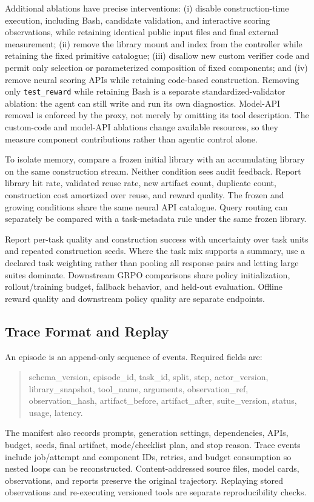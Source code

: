 Additional ablations have precise interventions: (i) disable construction-time execution, including Bash, candidate validation, and interactive scoring observations, while retaining identical public input files and final external measurement; (ii) remove the library mount and index from the controller while retaining the fixed primitive catalogue; (iii) disallow new custom verifier code and permit only selection or parameterized composition of fixed components; and (iv) remove neural scoring APIs while retaining code-based construction. Removing only \texttt{test\_reward} while retaining Bash is a separate standardized-validator ablation: the agent can still write and run its own diagnostics. Model-API removal is enforced by the proxy, not merely by omitting its tool description. The custom-code and model-API ablations change available resources, so they measure component contributions rather than agentic control alone.

To isolate memory, compare a frozen initial library with an accumulating library on the same construction stream. Neither condition sees audit feedback. Report library hit rate, validated reuse rate, new artifact count, duplicate count, construction cost amortized over reuse, and reward quality. The frozen and growing conditions share the same neural API catalogue. Query routing can separately be compared with a task-metadata rule under the same frozen library.

Report per-task quality and construction success with uncertainty over task units and repeated construction seeds. Where the task mix supports a summary, use a declared task weighting rather than pooling all response pairs and letting large suites dominate. Downstream GRPO comparisons share policy initialization, rollout/training budget, fallback behavior, and held-out evaluation. Offline reward quality and downstream policy quality are separate endpoints.

\subsection{Trace Format and Replay}

An episode is an append-only sequence of events. Required fields are:
\begin{quote}
\small\ttfamily
schema\_version, episode\_id, task\_id, split, step, actor\_version, library\_snapshot, tool\_name, arguments, observation\_ref, observation\_hash, artifact\_before, artifact\_after, suite\_version, status, usage, latency.
\end{quote}
The manifest also records prompts, generation settings, dependencies, APIs, budget, seeds, final artifact, mode/checklist plan, and stop reason. Trace events include job/attempt and component IDs, retries, and budget consumption so nested loops can be reconstructed. Content-addressed source files, model cards, observations, and reports preserve the original trajectory. Replaying stored observations and re-executing versioned tools are separate reproducibility checks.

